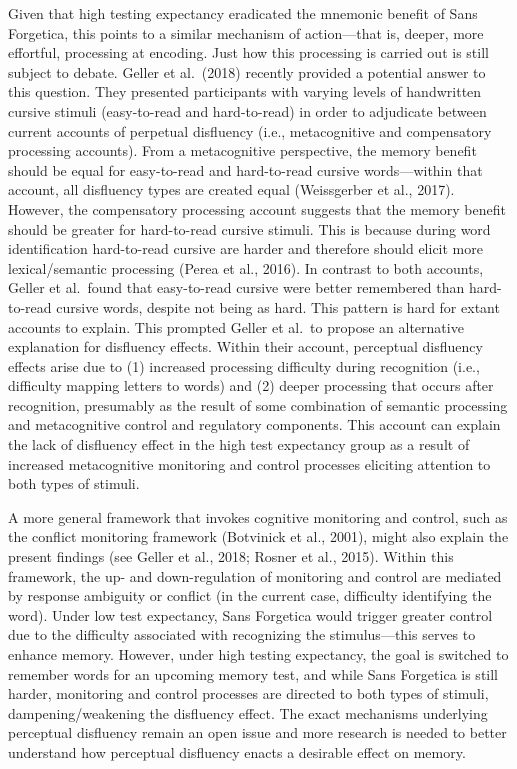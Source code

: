 \documentclass[
  english,
  jou]{apa7}
\begin{document}
Given that high testing expectancy eradicated the mnemonic benefit of Sans Forgetica, this points to a similar mechanism of action---that is, deeper, more effortful, processing at encoding. Just how this processing is carried out is still subject to debate. Geller et al.~(2018) recently provided a potential answer to this question. They presented participants with varying levels of handwritten cursive stimuli (easy-to-read and hard-to-read) in order to adjudicate between current accounts of perpetual disfluency (i.e., metacognitive and compensatory processing accounts). From a metacognitive perspective, the memory benefit should be equal for easy-to-read and hard-to-read cursive words---within that account, all disfluency types are created equal (Weissgerber et al., 2017). However, the compensatory processing account suggests that the memory benefit should be greater for hard-to-read cursive stimuli. This is because during word identification hard-to-read cursive are harder and therefore should elicit more lexical/semantic processing (Perea et al., 2016). In contrast to both accounts, Geller et al.~found that easy-to-read cursive were better remembered than hard-to-read cursive words, despite not being as hard. This pattern is hard for extant accounts to explain. This prompted Geller et al.~to propose an alternative explanation for disfluency effects. Within their account, perceptual disfluency effects arise due to (1) increased processing difficulty during recognition (i.e., difficulty mapping letters to words) and (2) deeper processing that occurs after recognition, presumably as the result of some combination of semantic processing and metacognitive control and regulatory components. This account can explain the lack of disfluency effect in the high test expectancy group as a result of increased metacognitive monitoring and control processes eliciting attention to both types of stimuli.

A more general framework that invokes cognitive monitoring and control, such as the conflict monitoring framework (Botvinick et al., 2001), might also explain the present findings (see Geller et al., 2018; Rosner et al., 2015). Within this framework, the up- and down-regulation of monitoring and control are mediated by response ambiguity or conflict (in the current case, difficulty identifying the word). Under low test expectancy, Sans Forgetica would trigger greater control due to the difficulty associated with recognizing the stimulus---this serves to enhance memory. However, under high testing expectancy, the goal is switched to remember words for an upcoming memory test, and while Sans Forgetica is still harder, monitoring and control processes are directed to both types of stimuli, dampening/weakening the disfluency effect. The exact mechanisms underlying perceptual disfluency remain an open issue and more research is needed to better understand how perceptual disfluency enacts a desirable effect on memory.
\end{document}
